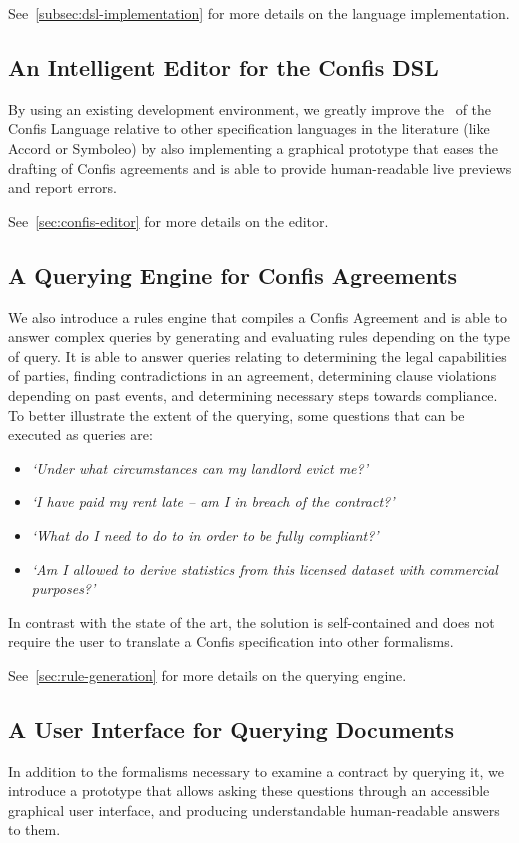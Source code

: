 See~\autoref{subsec:dsl-implementation} for more details on the language implementation.

\subsection{An Intelligent Editor for the Confis DSL}
By using an existing development environment, we greatly improve the~ of the Confis Language relative to other specification languages in the literature (like Accord or Symboleo) by also implementing a graphical prototype that eases the drafting of Confis agreements and is able to provide human-readable live previews and report errors.

See~\autoref{sec:confis-editor} for more details on the editor.

\subsection{A Querying Engine for Confis Agreements}
We also introduce a rules engine that compiles a Confis Agreement and is able to answer complex queries by generating and evaluating rules depending on the type of query.
It is able to answer queries relating to determining the legal capabilities of parties, finding contradictions in an agreement, determining clause violations depending on past events, and determining necessary steps towards compliance.
To better illustrate the extent of the querying, some questions that can be executed as queries are:
\begin{itemize}
    \item \emph{`Under what circumstances can my landlord evict me?'}
    \item \emph{`I have paid my rent late -- am I in breach of the contract?'}
    \item \emph{`What do I need to do to in order to be fully compliant?'}
    \item \emph{`Am I allowed to derive statistics from this licensed dataset with commercial purposes?'}
\end{itemize}
In contrast with the state of the art, the solution is self-contained and does not require the user to translate a Confis specification into other formalisms.

See~\autoref{sec:rule-generation} for more details on the querying engine.


\subsection{A User Interface for Querying Documents}
In addition to the formalisms necessary to examine a contract by querying it, we introduce a prototype that allows asking these questions through an accessible graphical user interface, and producing understandable human-readable answers to them.

